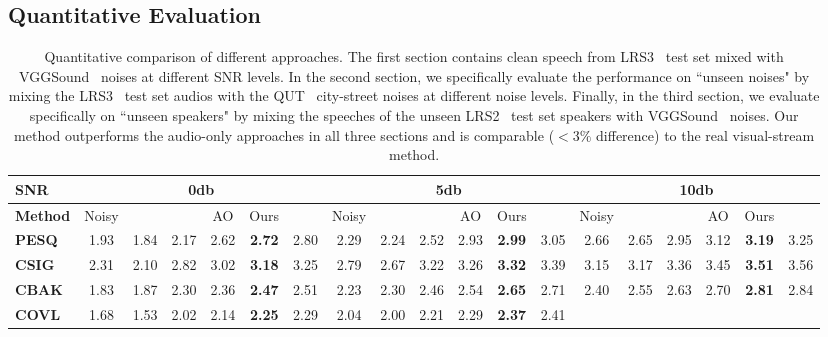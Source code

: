 \documentclass[10pt,twocolumn,letterpaper]{article}
\begin{document}
\subsection{Quantitative Evaluation}


\begin{table*}[ht]
  \setlength{\tabcolsep}{3.1pt}
    \centering
    \caption{Quantitative comparison of different approaches. The first section contains clean speech from LRS3~\cite{Afouras18d} test set mixed with VGGSound~\cite{9053174} noises at different SNR levels. In the second section, we specifically evaluate the performance on ``unseen noises" by mixing the LRS3~\cite{Afouras18d} test set audios with the QUT~\cite{9053174} city-street noises at different noise levels. Finally, in the third section, we evaluate specifically on ``unseen speakers" by mixing the speeches of the unseen LRS2~\cite{Afouras18c} test set speakers with VGGSound~\cite{9053174} noises. Our method outperforms the audio-only approaches in all three sections and is comparable ($< 3\%$ difference) to the real visual-stream method.}
    \begin{tabular}{l||ccc|cc|c||ccc|cc|c||ccc|cc|c}
    \hline
    \textbf{SNR} & \multicolumn{6}{c||}{0db} & \multicolumn{6}{c||}{5db} & \multicolumn{6}{c}{10db}
     \\
    \hline
    \textbf{Method} & 
    Noisy & \cite{segan} & \cite{Germain2019SpeechDW} & AO & Ours & \cite{TheConversation_Afouras_2018} & 
    Noisy & \cite{segan} & \cite{Germain2019SpeechDW} & AO & Ours & \cite{TheConversation_Afouras_2018} &  
    Noisy & \cite{segan} & \cite{Germain2019SpeechDW} & AO & Ours & \cite{TheConversation_Afouras_2018} \\
    \hline
    \textbf{PESQ} & 1.93 & 1.84 & 2.17 & 2.62 & \textbf{2.72} & 2.80 &
                    2.29 & 2.24 & 2.52 & 2.93 & \textbf{2.99} & 3.05 &
                    2.66 & 2.65 & 2.95 & 3.12 & \textbf{3.19} & 3.25\\
    \textbf{CSIG} & 2.31 & 2.10 & 2.82 & 3.02 & \textbf{3.18} & 3.25 &
                    2.79 & 2.67 & 3.22 & 3.26 & \textbf{3.32} & 3.39 &
                    3.15 & 3.17 & 3.36 & 3.45 & \textbf{3.51} & 3.56\\
    \textbf{CBAK} & 1.83 & 1.87 & 2.30 & 2.36 & \textbf{2.47} & 2.51 &
                    2.23 & 2.30 & 2.46 & 2.54 & \textbf{2.65} & 2.71 &
                    2.40 & 2.55 & 2.63 & 2.70 & \textbf{2.81} & 2.84\\
    \textbf{COVL} & 1.68 & 1.53 & 2.02 & 2.14 & \textbf{2.25} & 2.29 &
                    2.04 & 2.00 & 2.21 & 2.29 & \textbf{2.37} & 2.41 &

\end{tabular}
\end{table*}
\end{document}
